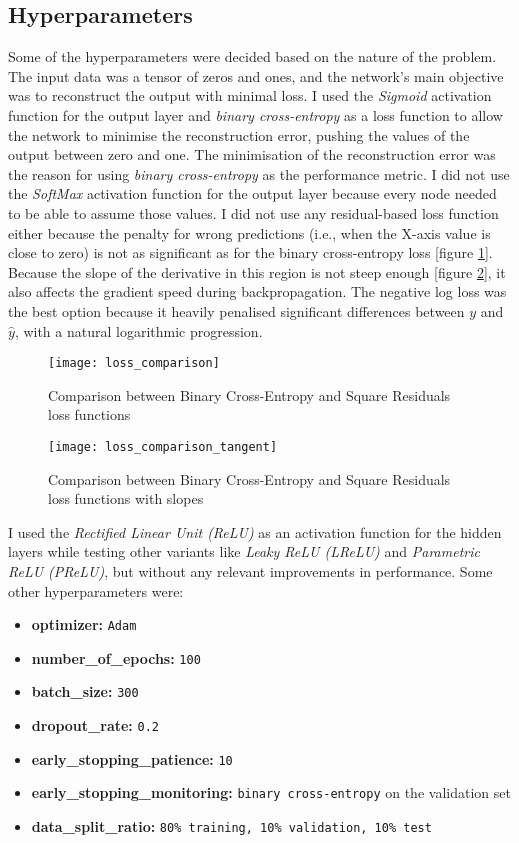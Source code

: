 \subsection{Hyperparameters}

Some of the hyperparameters were decided based on the nature of the problem.
The input data was a tensor of zeros and ones, and the network's main objective was to reconstruct the output with minimal loss.
I used the \textit{Sigmoid} activation function for the output layer and \textit{binary cross-entropy} as a loss function
to allow the network to minimise the reconstruction error, pushing the values of the output between zero and one.
The minimisation of the reconstruction error was the reason for using \textit{binary cross-entropy} as the performance metric.
I did not use the \textit{SoftMax} activation function for the output layer because every node needed to be able to assume those values.
I did not use any residual-based loss function either because the penalty for wrong predictions
(i.e., when the X-axis value is close to zero) is not as significant as for the binary cross-entropy loss [figure \ref{fig:loss_comparison}].
Because the slope of the derivative in this region is not steep enough [figure \ref{fig:loss_comparison_tangent}], it also affects the gradient speed during backpropagation.
The negative log loss was the best option because it heavily penalised significant differences between $y$ and $\hat{y}$,
with a natural logarithmic progression.

\begin{figure}[H]
  \centering
  \texttt{[image: loss\_comparison]}
  \caption{Comparison between Binary Cross-Entropy and Square Residuals loss functions}
  \label{fig:loss_comparison}
\end{figure}

\begin{figure}[H]
  \centering
  \texttt{[image: loss\_comparison\_tangent]}
  \caption{Comparison between Binary Cross-Entropy and Square Residuals loss functions with slopes}
  \label{fig:loss_comparison_tangent}
\end{figure}

I used the \textit{Rectified Linear Unit (ReLU)} as an activation function for the hidden layers
while testing other variants like \textit{Leaky ReLU (LReLU)} and \textit{Parametric ReLU (PReLU)},
but without any relevant improvements in performance.
Some other hyperparameters were:

\begin{itemize}
  \item \textbf{optimizer:} \verb|Adam|
  \item \textbf{number\_of\_epochs:} \verb|100|
  \item \textbf{batch\_size:} \verb|300|
  \item \textbf{dropout\_rate:} \verb|0.2|
  \item \textbf{early\_stopping\_patience:} \verb|10|
  \item \textbf{early\_stopping\_monitoring:} \verb|binary cross-entropy| on the validation set
  \item \textbf{data\_split\_ratio:} \verb|80% training, 10% validation, 10% test|
\end{itemize}

